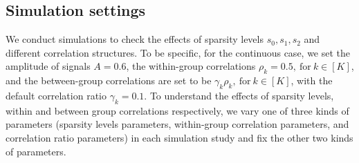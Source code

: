 \documentclass[11pt]{article}
\theoremstyle{plain}
\theoremstyle{definition}
\theoremstyle{remark}
\newcommand{\0}{\mathbf{0}}
\begin{document}
\subsection{Simulation settings}
We conduct simulations to check the effects of sparsity levels $s_0, s_1, s_2$ and different correlation structures. To be specific, for the continuous case, we set the amplitude of signals $A=0.6$, the within-group correlations $\rho_k=0.5, ~\text{for}~ k \in [K]$, and the between-group correlations are set to be $\gamma_k\rho_k, ~\text{for}~ k \in [K]$, with the default correlation ratio $\gamma_k=0.1$. To understand the effects of sparsity levels, within and between group correlations respectively, we vary one of three kinds of parameters (sparsity levels parameters, within-group correlation parameters, and correlation ratio parameters) in each simulation study and fix the other two kinds of parameters. 
\end{document}
